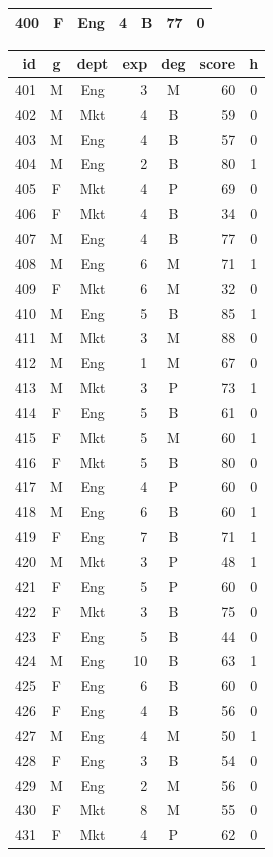 \documentclass[11pt,a4paper]{article}
\begin{document}
\begin{center}
\begin{tabular}[t]{@{}r c c r c r c@{}}
400 & F & Eng & 4 & B & 77 & 0 \\
\bottomrule
\end{tabular}
\hfill
\begin{tabular}[t]{@{}r c c r c r c@{}}
\toprule
id & g & dept & exp & deg & score & h \\
\midrule
401 & M & Eng & 3 & M & 60 & 0 \\
402 & M & Mkt & 4 & B & 59 & 0 \\
403 & M & Eng & 4 & B & 57 & 0 \\
404 & M & Eng & 2 & B & 80 & 1 \\
405 & F & Mkt & 4 & P & 69 & 0 \\
406 & F & Mkt & 4 & B & 34 & 0 \\
407 & M & Eng & 4 & B & 77 & 0 \\
408 & M & Eng & 6 & M & 71 & 1 \\
409 & F & Mkt & 6 & M & 32 & 0 \\
410 & M & Eng & 5 & B & 85 & 1 \\
411 & M & Mkt & 3 & M & 88 & 0 \\
412 & M & Eng & 1 & M & 67 & 0 \\
413 & M & Mkt & 3 & P & 73 & 1 \\
414 & F & Eng & 5 & B & 61 & 0 \\
415 & F & Mkt & 5 & M & 60 & 1 \\
416 & F & Mkt & 5 & B & 80 & 0 \\
417 & M & Eng & 4 & P & 60 & 0 \\
418 & M & Eng & 6 & B & 60 & 1 \\
419 & F & Eng & 7 & B & 71 & 1 \\
420 & M & Mkt & 3 & P & 48 & 1 \\
421 & F & Eng & 5 & P & 60 & 0 \\
422 & F & Mkt & 3 & B & 75 & 0 \\
423 & F & Eng & 5 & B & 44 & 0 \\
424 & M & Eng & 10 & B & 63 & 1 \\
425 & F & Eng & 6 & B & 60 & 0 \\
426 & F & Eng & 4 & B & 56 & 0 \\
427 & M & Eng & 4 & M & 50 & 1 \\
428 & F & Eng & 3 & B & 54 & 0 \\
429 & M & Eng & 2 & M & 56 & 0 \\
430 & F & Mkt & 8 & M & 55 & 0 \\
431 & F & Mkt & 4 & P & 62 & 0 \\

\end{tabular}
\end{center}
\end{document}
